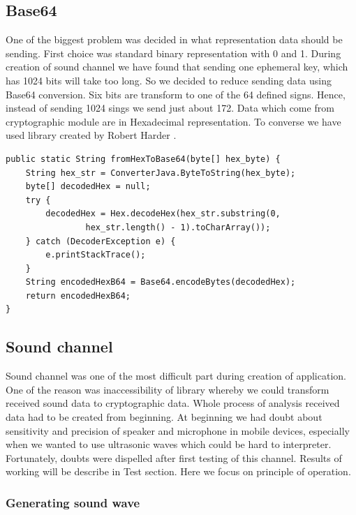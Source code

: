 \documentclass[11pt,titlepage]{article}
\theoremstyle{plain}
\begin{document}
\subsection{Base64}

One of the biggest problem was decided in what representation data should be sending. First choice was standard binary representation with 0 and 1. During creation of sound channel we have found that sending one ephemeral key, which has 1024 bits will take too long. So we decided to reduce sending data using Base64 conversion. Six bits are transform to one of the 64 defined signs. Hence, instead of sending 1024 sings we send just about 172. Data which come from cryptographic module are in Hexadecimal representation. To converse we have used library created by Robert Harder \cite{base_64}. 

\begin{lstlisting}[caption={Example of code converting from Hex String to Base64 String}]
public static String fromHexToBase64(byte[] hex_byte) {
	String hex_str = ConverterJava.ByteToString(hex_byte);
	byte[] decodedHex = null;
	try {
		decodedHex = Hex.decodeHex(hex_str.substring(0,
				hex_str.length() - 1).toCharArray());
	} catch (DecoderException e) {
		e.printStackTrace();
	}
	String encodedHexB64 = Base64.encodeBytes(decodedHex);
	return encodedHexB64;
}
\end{lstlisting}

\subsection{Sound channel}

Sound channel was one of the most difficult part during creation of application. One of the reason was inaccessibility of library whereby we could transform received sound data to cryptographic data. Whole process of analysis received data had to be created from beginning. At beginning we had doubt about sensitivity and precision of speaker and microphone in mobile devices, especially when we wanted to use ultrasonic waves which could be hard to interpreter. Fortunately, doubts were dispelled after first testing of this channel. Results of working will be describe in Test section. Here we focus on principle of operation.

\subsubsection{Generating sound wave}
\end{document}
